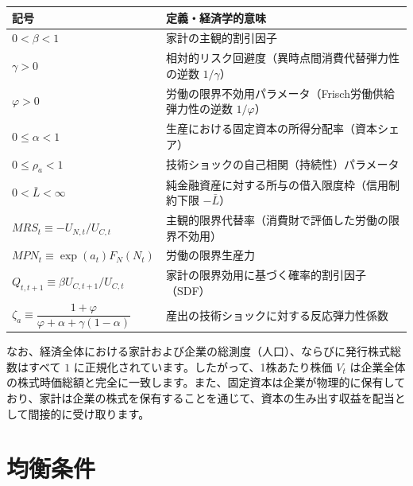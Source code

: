 \documentclass[
  japanese,
  lualatex,
  ja=standard,
  12pt,
  a4paper]{ltjsarticle}
\newcounter{none} %
\begin{document}
{\def\LTcaptype{none} %
\begin{longtable}[]{@{}
  >{\raggedright\arraybackslash}p{}
  >{\raggedright\arraybackslash}p{}@{}}
\toprule\noalign{}
\begin{minipage}[b]{\linewidth}\raggedright
記号
\end{minipage} & \begin{minipage}[b]{\linewidth}\raggedright
定義・経済学的意味
\end{minipage} \\
\midrule\noalign{}
\endhead
\bottomrule\noalign{}
\endlastfoot
\(0 < \beta < 1\) & 家計の主観的割引因子 \\
\(\gamma > 0\) & 相対的リスク回避度（異時点間消費代替弾力性の逆数
\(1/\gamma\)） \\
\(\varphi > 0\) & 労働の限界不効用パラメータ（Frisch労働供給弾力性の逆数
\(1/\varphi\)） \\
\(0 \leq \alpha < 1\) &
生産における固定資本の所得分配率（資本シェア） \\
\(0 \leq \rho_a < 1\) & 技術ショックの自己相関（持続性）パラメータ \\
\(0 < \bar{L} < \infty\) &
純金融資産に対する所与の借入限度枠（信用制約下限 \(-\bar{L}\)） \\
\(MRS_t \equiv -U_{N,t}/U_{C,t}\) &
主観的限界代替率（消費財で評価した労働の限界不効用） \\
\(MPN_t \equiv \exp(a_t) F_N(N_t)\) & 労働の限界生産力 \\
\(Q_{t,t+1} \equiv \beta U_{C,t+1}/U_{C,t}\) &
家計の限界効用に基づく確率的割引因子（SDF） \\
\(\zeta_a \equiv \dfrac{1+\varphi}{\varphi+\alpha+\gamma(1-\alpha)}\) &
産出の技術ショックに対する反応弾力性係数 \\
\end{longtable}
}

なお、経済全体における家計および企業の総測度（人口）、ならびに発行株式総数はすべて
\(1\) に正規化されています。したがって、1株あたり株価 \(V_t\)
は企業全体の株式時価総額と完全に一致します。また、固定資本は企業が物理的に保有しており、家計は企業の株式を保有することを通じて、資本の生み出す収益を配当として間接的に受け取ります。

\section{均衡条件}\label{ux5747ux8861ux6761ux4ef6}
\end{document}
